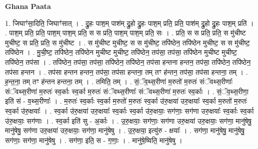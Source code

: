 \documentclass[17pt]{extarticle}
\begin{document}
\textbf{Ghana Paata } \newline

1. जिघाꣳ॑सा॒दिति॒ जिघाꣳ॑सात् । . द्रु॒हः पाश॒म् पाश॑म् द्रु॒हो द्रु॒हः पाश॒म् प्रति॒ प्रति॒ पाश॑म् द्रु॒हो द्रु॒हः पाश॒म् प्रति॑ । . पाश॒म् प्रति॒ प्रति॒ पाश॒म् पाश॒म् प्रति॒ स स प्रति॒ पाश॒म् पाश॒म् प्रति॒ सः । . प्रति॒ स स प्रति॒ प्रति॒ स मु॑चीष्ट मुचीष्ट॒ स प्रति॒ प्रति॒ स मु॑चीष्ट । . स मु॑चीष्ट मुचीष्ट॒ स स मु॑चीष्ट॒ तपि॑ष्ठेन॒ तपि॑ष्ठेन मुचीष्ट॒ स स मु॑चीष्ट॒ तपि॑ष्ठेन । . मु॒ची॒ष्ट॒ तपि॑ष्ठेन॒ तपि॑ष्ठेन मुचीष्ट मुचीष्ट॒ तपि॑ष्ठेन॒ तप॑सा॒ तप॑सा॒ तपि॑ष्ठेन मुचीष्ट मुचीष्ट॒ तपि॑ष्ठेन॒ तप॑सा । . तपि॑ष्ठेन॒ तप॑सा॒ तप॑सा॒ तपि॑ष्ठेन॒ तपि॑ष्ठेन॒ तप॑सा हन्तना हन्तन॒ तप॑सा॒ तपि॑ष्ठेन॒ तपि॑ष्ठेन॒ तप॑सा हन्तन । . तप॑सा हन्तन हन्तन॒ तप॑सा॒ तप॑सा हन्तना॒ तम् तꣳ ह॑न्तन॒ तप॑सा॒ तप॑सा हन्तना॒ तम् । . ह॒न्त॒ना॒ तम् तꣳ ह॑न्तन हन्तना॒ तम् । . तमिति॒ तम् । . सं॒ॅव॒थ्स॒रीणा॑ म॒रुतो॑ म॒रुतः॑ संॅवथ्स॒रीणाः᳚ संॅवथ्स॒रीणा॑ म॒रुतः॑ स्व॒र्काः स्व॒र्का म॒रुतः॑ संॅवथ्स॒रीणाः᳚ संॅवथ्स॒रीणा॑ म॒रुतः॑ स्व॒र्काः । . सं॒ॅव॒थ्स॒रीणा॒ इति॑ सं - व॒थ्स॒रीणाः᳚ । . म॒रुतः॑ स्व॒र्काः स्व॒र्का म॒रुतो॑ म॒रुतः॑ स्व॒र्का उ॑रु॒क्षया॑ उरु॒क्षयाः᳚ स्व॒र्का म॒रुतो॑ म॒रुतः॑ स्व॒र्का उ॑रु॒क्षयाः᳚ । . स्व॒र्का उ॑रु॒क्षया॑ उरु॒क्षयाः᳚ स्व॒र्काः स्व॒र्का उ॑रु॒क्षयाः॒ सग॑णाः॒ सग॑णा उरु॒क्षयाः᳚ स्व॒र्काः स्व॒र्का उ॑रु॒क्षयाः॒ सग॑णाः । . स्व॒र्का इति॑ सु - अ॒र्काः । . उ॒रु॒क्षयाः॒ सग॑णाः॒ सग॑णा उरु॒क्षया॑ उरु॒क्षयाः॒ सग॑णा॒ मानु॑षेषु॒ मानु॑षेषु॒ सग॑णा उरु॒क्षया॑ उरु॒क्षयाः॒ सग॑णा॒ मानु॑षेषु । . उ॒रु॒क्षया॒ इत्यु॑रु - क्षयाः᳚ । . सग॑णा॒ मानु॑षेषु॒ मानु॑षेषु॒ सग॑णाः॒ सग॑णा॒ मानु॑षेषु । . सग॑णा॒ इति॒ स - ग॒णाः॒ । . मानु॑षे॒ष्विति॒ मानु॑षेषु । \newline
\end{document}
